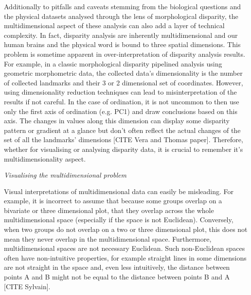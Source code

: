 \documentclass[12pt,letterpaper]{article}
\renewcommand{\subsection}[1]{%
\bigskip
\begin{center}
\begin{large}
\normalfont\itshape #1
\end{large}
\end{center}}
\begin{document}
Additionally to pitfalls and caveats stemming from the biological questions and the physical datasets analysed through the lens of morphological disparity, the multidimensional aspect of these analysis can also add a layer of technical complexity.
In fact, disparity analysis are inherently multidimensional and our human brains and the physical word is bound to three spatial dimensions.
This problem is sometime apparent in over-interpretation of disparity analysis results.
For example, in a classic morphological disparity pipelined analysis using geometric morphometric data, the collected data's dimensionality is the number of collected landmarks and their 3 or 2 dimensional set of coordinates.
However, using dimensionality reduction techniques can lead to misinterpretation of the results if not careful.
In the case of ordination, it is not uncommon to then use only the first axis of ordination (e.g. PC1) and draw conclusions based on this axis.
The changes in values along this dimension can display some disparity pattern or gradient at a glance but don't often reflect the actual changes of the set of all the landmarks' dimensions [CITE Vera and Thomas paper].
Therefore, whether for visualising or analysing disparity data, it is crucial to remember it's multidimensionality aspect.

\subsection{Visualising the multidimensional problem}
\label{visualisation}
Visual interpretations of multidimensional data can easily be misleading.
For example, it is incorrect to assume that because some groups overlap on a bivariate or three dimensional plot, that they overlap across the whole multidimensional space (especially if the space is not Euclidean).
Conversely, when two groups do not overlap on a two or three dimensional plot, this does not mean they never overlap in the multidimensional space.
Furthermore, multidimensional spaces are not necessary Euclidean.
Such non-Euclidean spaces often have non-intuitive properties, for example straight lines in some dimensions are not straight in the space and, even less intuitively, the distance between points A and B might not be equal to the distance between points B and A [CITE Sylvain].
\end{document}
